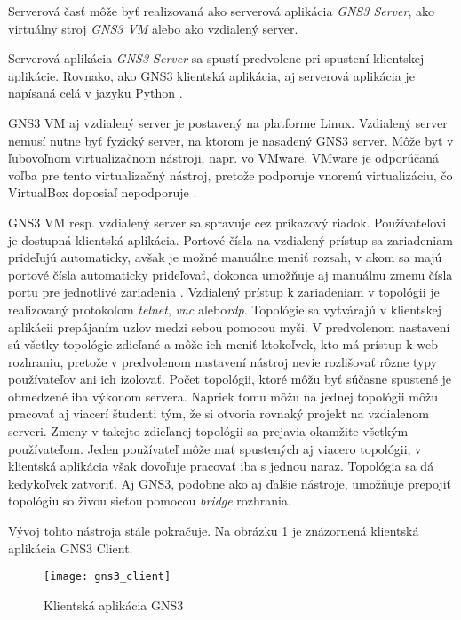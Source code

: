 Serverová časť môže byť realizovaná ako serverová aplikácia \emph{GNS3 Server}, ako virtuálny stroj \emph{GNS3 VM} alebo ako vzdialený server.

Serverová aplikácia \emph{GNS3 Server} sa spustí predvolene pri spustení klientskej aplikácie. Rovnako, ako GNS3 klientská aplikácia, aj serverová aplikácia je napísaná celá v jazyku Python \cite{gns3_server_github}.

GNS3 VM aj vzdialený server je postavený na platforme Linux. Vzdialený server nemusí nutne byť fyzický server, na ktorom je nasadený GNS3 server. Môže byť v ľubovoľnom virtualizačnom nástroji, napr. vo VMware. VMware je odporúčaná voľba pre tento virtualizačný nástroj, pretože podporuje vnorenú virtualizáciu, čo VirtualBox doposiaľ nepodporuje \cite{nested_virtualization}.

GNS3 VM resp. vzdialený server sa spravuje cez príkazový riadok. Používateľovi je dostupná klientská aplikácia. Portové čísla na vzdialený prístup sa zariadeniam prideľujú automaticky, avšak je možné manuálne meniť rozsah, v akom sa majú portové čísla automaticky prideľovať, dokonca umožňuje aj manuálnu zmenu čísla portu pre jednotlivé zariadenia \cite{gns3_console_ports, gns3_console_ports_remote}. Vzdialený prístup k zariadeniam v topológii je realizovaný protokolom \emph{telnet}, \emph{vnc} alebo\emph{rdp}. Topológie sa vytvárajú v klientskej aplikácii prepájaním uzlov medzi sebou pomocou myši. V predvolenom nastavení sú všetky topológie zdieľané a môže ich meniť ktokoľvek, kto má prístup k web rozhraniu, pretože v predvolenom nastavení nástroj nevie rozlišovať rôzne typy používateľov ani ich izolovať. Počet topológii, ktoré môžu byť súčasne spustené je obmedzené iba výkonom servera. Napriek tomu môžu na jednej topológii môžu pracovať aj viacerí študenti tým, že si otvoria rovnaký projekt na vzdialenom serveri. Zmeny v takejto zdieľanej topológii sa prejavia okamžite všetkým používateľom. Jeden používateľ môže mať spustených aj viacero topológii, v klientská aplikácia však dovoľuje pracovať iba s jednou naraz. Topológia sa dá kedykoľvek zatvoriť. Aj GNS3, podobne ako aj ďalšie nástroje, umožňuje prepojiť topológiu so živou sieťou pomocou \emph{bridge} rozhrania.

Vývoj tohto nástroja stále pokračuje. Na obrázku \ref{obr:gns3_client} je znázornená klientská aplikácia GNS3 Client.

\begin{figure}
    \centering
    \texttt{[image: gns3\_client]}
    \caption{Klientská aplikácia GNS3}
    \label{obr:gns3_client}
\end{figure}


